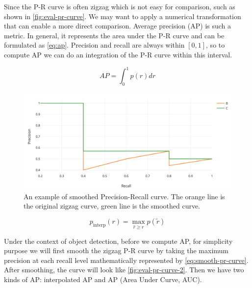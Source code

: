 Since the P-R curve is often zigzag which is not easy for comparison, such as shown 
in \autoref{fig:eval-pr-curve}. We may want to apply a
numerical transformation that can enable a more direct comparison. Average precision (AP) is such a metric.
In general, it represents the area under the P-R curve and can be formulated as
\autoref{eq:ap}. Precision and recall are always within $[0, 1]$, so to compute
AP we can do an integration of the P-R curve within this interval.

\begin{equation}
\label{eq:ap}
\mathit{AP} = \int_0^1p(r)dr
\end{equation}
%

\begin{figure}
    \begin{center}
        \includegraphics[scale=0.25]{figures/eval_pr_curve2.png}
    \end{center}
    \caption[{An example of smoothed Precision-Recall curve}]
    {An example of smoothed Precision-Recall curve. The orange line is the original
        zigzag curve, green line is the smoothed curve.}
    \label{fig:eval-pr-curve-2}
\end{figure}

\begin{equation}
\label{eq:smooth-pr-curve}
p_{\text {interp}}(r)=\max _{\widehat{r} \geq r} p(\widetilde{r})
\end{equation}

Under the context of object detection, before we compute AP, for simplicity
purpose we will first smooth the zigzag P-R curve by taking the maximum
precision at each recall level mathematically represented by
\autoref{eq:smooth-pr-curve}.
After smoothing, the curve will look like \autoref{fig:eval-pr-curve-2}. Then we
have two kinds of AP: interpolated AP and AP (Area Under Curve, AUC).

